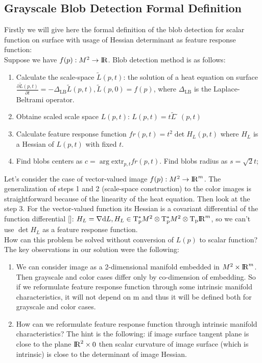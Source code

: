 \documentclass{llncs}
\newcommand{\LaplaceBeltrami}{\Delta_{\mathrm{LB}}}
\newcommand{\partderiv}[2]{\frac{\partial #1}{\partial #2}}
\newcommand{\extr}[1]{\mathrm{extr}_{#1}}
\newcommand{\toreal}{\rightarrow\bbbr}
\newcommand{\toeuclidean}[1]{\rightarrow\bbbr^{#1}}
\newcommand{\CovariantDiff}{\nabla}
\newcommand{\Diff}{\mathrm{d}}
\newcommand{\TangentSpaceP}[1]{\mathrm{T_p}{#1}}
\newcommand{\CotangentSpaceP}[1]{\tensor*{\mathrm{T}}{^{*}_{\mathrm{p}}}{#1}}
\begin{document}
\subsection{Grayscale Blob Detection Formal Definition}
Firstly we will give here the formal definition of the blob detection for scalar function on surface with usage of Hessian determinant as feature response function: \\
Suppose we have  $f(p):M^2 \toreal$. Blob detection method is as follows:
\begin{enumerate} 
\item Calculate the scale-space $\tilde{L}(p,t)$: the solution of a heat equation  on surface
  $\partderiv{\tilde{L}(p, t)}{t}=-\LaplaceBeltrami{ \tilde{L}(p, t)},\tilde{L}(p, 0)=f(p)$, where $\LaplaceBeltrami$ is the Laplace-Beltrami operator.
\item Obtaine scaled scale space $L(p, t)$: $L(p, t)=t\tilde{L} ̃(p, t)$
\item Calculate feature response function $fr(p, t)=t^2 \det{H_L(p,t)}$ where $H_L$ is a Hessian of $L(p, t)$  with fixed $t$.
\item Find blobs centers as $c=\arg \extr{p,t} fr(p, t)$. Find blobs radius as $s=\sqrt{2} t$;
\end{enumerate}

Let’s consider the case of vector-valued image $f(p):M^2 \toeuclidean{m}$. The generalization of steps 1 and 2 (scale-space construction) to the color images is straightforward because of the linearity of the heat equation. Then look at the step 3. For the vector-valued function its Hessian is a covariant differential of the function differential []: $H_L=\CovariantDiff \Diff L ,H_L \in \CotangentSpaceP{M^2}\otimes\CotangentSpaceP{M^2}\otimes\TangentSpaceP{\bbbr^m}$, so we can’t use  $\det H_L$ as a feature response function. 
\\
How can this problem be solved without conversion of $L(p)$ to scalar function? The key observations in our solution were the following:
\begin{enumerate}
\item	We can consider image as a 2-dimensional manifold embedded in $M^2\times{\rm I\!R}^m$. Then grayscale and color cases differ only by co-dimension of embedding. So if we reformulate feature response function through some intrinsic manifold characteristics, it will not depend on m and thus it will be defined both for grayscale and color cases. 
\item	How can we reformulate feature response function through intrinsic manifold characteristics? The hint is the following: if image surface tangent plane is close to the plane ${\rm I\!R}^2\times 0$ then scalar curvature of image surface (which is intrinsic) is close to the determinant of image Hessian. 
\end{enumerate}
\end{document}
